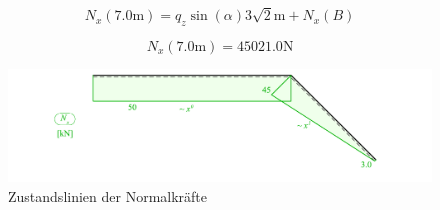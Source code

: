 \documentclass[
  12pt,
  letterpaper,
  DIV=11,
  egregdoesnotlikesansseriftitles]{scrartcl}
\begin{document}
\begin{equation}N_{x}{\left(7.0 \text{m} \right)} = q_{z} \sin{\left(\alpha \right)} 3 \sqrt{2} \text{m} + N_{x}{\left(B \right)}\end{equation}

\begin{equation}N_{x}{\left(7.0 \text{m} \right)} = 45021.0 \text{N}\end{equation}

\begin{figure}[H]

{\centering \includegraphics{BSI_HS23_Testat_02_files/mediabag/../images/Testat_02_HS23_Nx.pdf}

}

\caption{Zustandslinien der Normalkräfte}

\end{figure}
\end{document}
